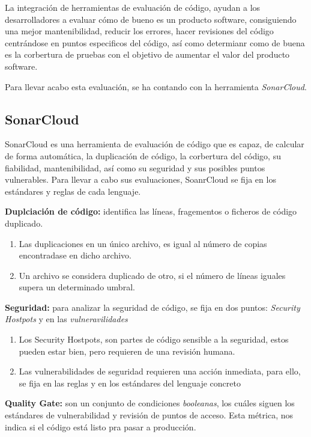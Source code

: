 La integración de herramientas de evaluación de código, ayudan a los desarrolladores a evaluar cómo de bueno es un producto software, consiguiendo una mejor mantenibilidad, reducir los errores, hacer revisiones del código centrándose en puntos especificos del código, así como determianr como de buena es la corbertura de pruebas con el objetivo de aumentar el valor del producto software.

Para llevar acabo esta evaluación, se ha contando con la herramienta \textit{SonarCloud}. 

\subsection*{SonarCloud}

SonarCloud \cite{sonar_cloud} es una herramienta de evaluación de código que es capaz, de calcular de forma automática, la duplicación de código, la corbertura del código, su fiabilidad, mantenibilidad, así como su seguridad y sus posibles puntos vulnerables.
Para llevar a cabo sus evaluaciones, SoanrCloud se fija en los estándares y reglas de cada lenguaje.

\begin{list}{\textbullet}{ %
    \addtolength{\itemsep}{-2mm} %
    \setlength{\itemindent}{2mm}}

    \item \textbf{Duplciación de código:} identifica las líneas, fragementos o ficheros de código duplicado.
    \begin{enumerate}
        \item Las duplicaciones en un único archivo, es igual al número de copias encontradase en dicho archivo.
        \item Un archivo se considera duplicado de otro, si el número de líneas iguales supera un determinado umbral.
    \end{enumerate}
    \item \textbf{Seguridad:} para analizar la seguridad de código, se fija en dos puntos: \textit{Security Hostpots} y en las \textit{vulneravilidades}
    \begin{enumerate}
        \item Los Security Hostpots, son partes de código sensible a la seguridad, estos pueden estar bien, pero requieren de una revisión humana.
        \item Las vulnerabilidades de seguridad requieren una acción inmediata, para ello, se fija en las reglas  y en los estándares del lenguaje concreto
    \end{enumerate}
    \item \textbf{Quality Gate:} son un conjunto de condiciones \textit{booleanas}, los cuáles siguen los estándares de vulnerabilidad y revisión de puntos de acceso. Esta métrica, nos indica si el código está listo pra pasar a producción.
\end{list}

